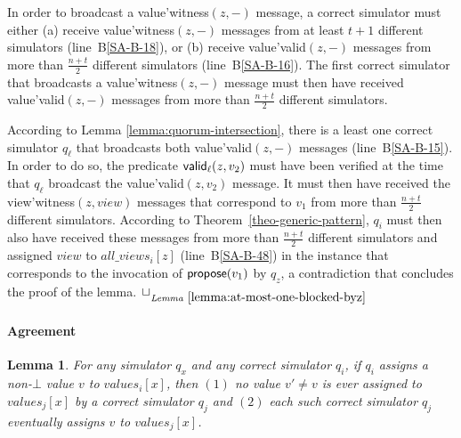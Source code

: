\documentclass[11pt,letterpaper]{article}
\newtheorem{lemma}{Lemma}
\newlength {\afterproof}
\newcommand{\toto}{xxx}
\newenvironment{proofL}{\noindent{\bf Proof }}
{\hspace*{\fill}$\Box_{\mathit{Lemma}~\ref{\toto}}$\par\vspace{\afterproof}}
\begin{document}
\begin{proofL}
In order to broadcast a {\sc value'witness}$(z,-)$ message,
a correct simulator must either (a) receive {\sc value'witness}$(z,-)$ 
messages from at least $t+1$ different simulators (line~B\ref{SA-B-18}),
or (b) receive {\sc value'valid}$(z,-)$ messages from more than $\frac{n+t}{2}$ 
different simulators (line~B\ref{SA-B-16}). The first correct simulator 
that broadcasts a 
{\sc value'witness}$(z,-)$ message must then have received 
{\sc value'valid}$(z,-)$ messages from more than $\frac{n+t}{2}$ 
different simulators.

According to Lemma 
\ref{lemma:quorum-intersection}, there is a least one correct simulator 
$q_\ell$ that broadcasts both {\sc value'valid}$(z,-)$ messages 
(line~B\ref{SA-B-15}). 
In order to 
do so, the predicate ${\sf valid}_\ell(z,v_2)$ must have been verified 
 at the time that $q_\ell$  broadcast the 
{\sc value'valid}$(z,v_2)$ message. It must then have received 
the {\sc view'witness}$(z,view)$ messages that correspond to $v_1$ 
from more than $\frac{n+t}{2}$ different 
simulators. According to Theorem~\ref{theo-generic-pattern},
$q_i$ must then also have received these messages from more than 
$\frac{n+t}{2}$ different 
simulators and assigned $view$ to $all\_views_i[z]$ (line~B\ref{SA-B-48}) 
in the instance that corresponds to the invocation of ${\sf propose}(v_1)$ 
by $q_z$, a contradiction that concludes the proof of the lemma.
\renewcommand{\toto}{lemma:at-most-one-blocked-byz}
\end{proofL}



\paragraph{Agreement}

\begin{lemma}
For any simulator $q_x$ and any correct simulator $q_i$, if $q_i$ assigns a
non-$\bot$ value $v$ to $values_i[x]$,
then  $(1)$ no  value $v'\neq  v$ is  ever assigned  to $values_j[x]$  by a
correct  simulator $q_j$  and    $(2)$ each  such  correct simulator  $q_j$
eventually assigns $v$ to $values_j[x]$.
\label{lemma-byz-uniform}
\end{lemma}
\end{document}
